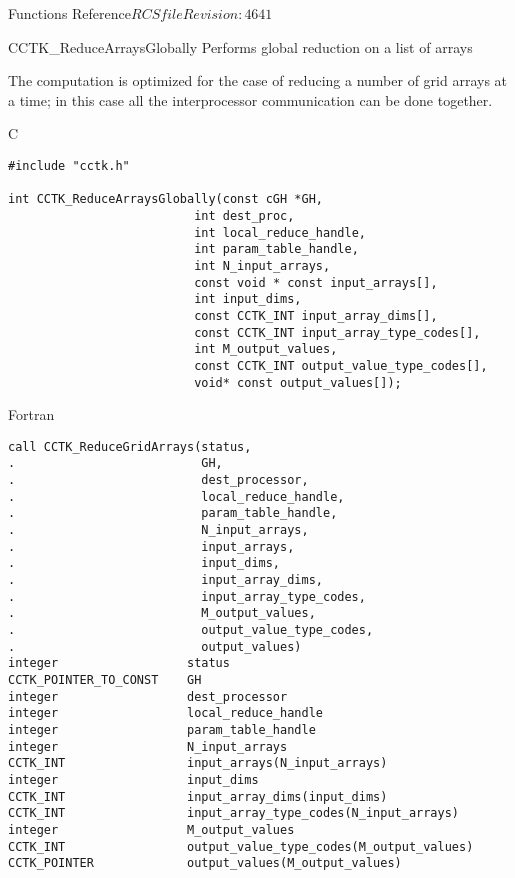 \begin{cactuspart}{ Functions Reference}{$RCSfile$}{$Revision: 4641 $}

\begin{FunctionDescription}{CCTK\_ReduceArraysGlobally}
\label{CCTK-ReduceArraysGlobally}
Performs global reduction on a list of arrays

The computation is optimized for the case of reducing a
number of grid arrays at a time; in this case all the interprocessor
communication can be done together.

\begin{SynopsisSection}
\begin{Synopsis}{C}
\begin{verbatim}
#include "cctk.h"

int CCTK_ReduceArraysGlobally(const cGH *GH,
                          int dest_proc,
                          int local_reduce_handle,
                          int param_table_handle,
                          int N_input_arrays,
                          const void * const input_arrays[],
                          int input_dims,
                          const CCTK_INT input_array_dims[],
                          const CCTK_INT input_array_type_codes[],
                          int M_output_values,
                          const CCTK_INT output_value_type_codes[],
                          void* const output_values[]);
\end{verbatim}
\end{Synopsis}
\begin{Synopsis}{Fortran}
\begin{verbatim}
call CCTK_ReduceGridArrays(status,
.                          GH,
.                          dest_processor,
.                          local_reduce_handle,
.                          param_table_handle,
.                          N_input_arrays,
.                          input_arrays,
.                          input_dims,
.                          input_array_dims,
.                          input_array_type_codes,
.                          M_output_values,
.                          output_value_type_codes,
.                          output_values)
integer                  status
CCTK_POINTER_TO_CONST    GH
integer                  dest_processor
integer                  local_reduce_handle
integer                  param_table_handle
integer                  N_input_arrays
CCTK_INT                 input_arrays(N_input_arrays)
integer                  input_dims
CCTK_INT                 input_array_dims(input_dims)
CCTK_INT                 input_array_type_codes(N_input_arrays)
integer                  M_output_values
CCTK_INT                 output_value_type_codes(M_output_values)
CCTK_POINTER             output_values(M_output_values)
\end{verbatim}
\end{Synopsis}
\end{SynopsisSection}


\end{FunctionDescription}
\end{cactuspart}
